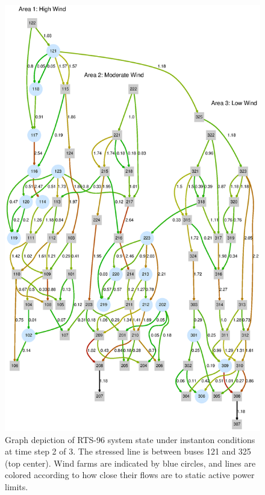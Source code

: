 \documentclass[conference]{IEEEtran}
\begin{document}

\begin{figure}
\centering
\includegraphics[width=1\linewidth]{../images/line118}
\caption{Graph depiction of RTS-96 system state under instanton conditions at time step 2 of 3. The stressed line is between buses 121 and 325 (top center). Wind farms are indicated by blue circles, and lines are colored according to how close their flows are to static active power limits.}
\label{fig:line118}
\end{figure}
\end{document}
